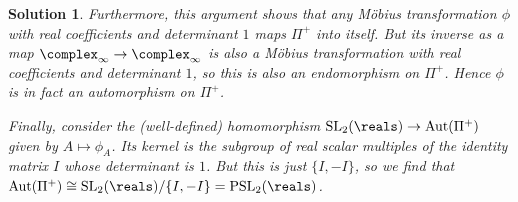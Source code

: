 \documentclass[article, a4paper, 11pt, oneside]{memoir}
\numberwithin{equation}{chapter}
\theoremstyle{nonumberplain}
\newtheorem{solution}{Solution}
\DeclareMathOperator{\Aut}{Aut}
\newcommand{\matgroup}[3]{\mathrm{#1}_{#2}(#3)}
\newcommand{\SL}[2]{\matgroup{SL}{#1}{#2}}
\newcommand{\PSL}[2]{\matgroup{PSL}{#1}{#2}}
\begin{document}
\begin{solution}
    Furthermore, this argument shows that any Möbius transformation $\phi$ with real coefficients and determinant $1$ maps $\Pi^+$ into itself. But its inverse as a map $\complex_\infty \to \complex_\infty$ is also a Möbius transformation with real coefficients and determinant $1$, so this is also an endomorphism on $\Pi^+$. Hence $\phi$ is in fact an automorphism on $\Pi^+$.

    Finally, consider the (well-defined) homomorphism $\SL{2}{\reals} \to \Aut(\Pi^+)$ given by $A \mapsto \phi_A$. Its kernel is the subgroup of real scalar multiples of the identity matrix $I$ whose determinant is $1$. But this is just $\{I,-I\}$, so we find that $\Aut(\Pi^+) \cong \SL{2}{\reals}/\{I,-I\} = \PSL{2}{\reals}$.
\end{solution}
\end{document}
